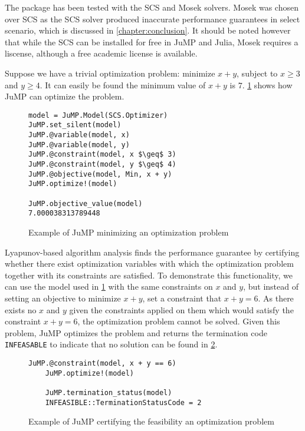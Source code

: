The package has been tested with the SCS \cite{SCS} and Mosek solvers. Mosek was chosen over SCS as the SCS solver produced inaccurate performance guarantees in select scenario, which is discussed in \cref{chapter:conclusion}. It should be noted however that while the SCS can be installed for free in JuMP and Julia, Mosek requires a liscense, although a free academic license is available.
 
Suppose we have a trivial optimization problem: minimize $x + y$, subject to $x \geq 3$ and $y \geq 4$. It can easily be found the minimum value of $x + y$ is $7$. \cref{ex_jump1} shows how JuMP can optimize the problem.

\begin{figure}[ht]
	\begin{lstlisting}[mathescape]
model = JuMP.Model(SCS.Optimizer)
JuMP.set_silent(model)
JuMP.@variable(model, x)
JuMP.@variable(model, y)
JuMP.@constraint(model, x $\geq$ 3)
JuMP.@constraint(model, y $\geq$ 4)
JuMP.@objective(model, Min, x + y)
JuMP.optimize!(model)

JuMP.objective_value(model)
7.000038313789448
	\end{lstlisting}
	\caption{Example of JuMP minimizing an optimization problem}
	\label{ex_jump1}
\end{figure}

Lyapunov-based algorithm analysis finds the performance guarantee by certifying whether there exist optimization variables with which the optimization problem together with its constraints are satisfied. To demonstrate this functionality, we can use the model used in \cref{ex_jump1} with the same constraints on $x$ and $y$, but instead of setting an objective to minimize $x + y$, set a constraint that $x + y = 6$. As there exists no $x$ and $y$ given the constraints applied on them which would satisfy the constraint $x + y = 6$, the optimization problem cannot be solved. Given this problem, JuMP optimizes the problem and returns the termination code \texttt{INFEASABLE} to indicate that no solution can be found in \cref{ex_jump2}.

\begin{figure}[ht]
	\begin{lstlisting}[mathescape]
	JuMP.@constraint(model, x + y == 6)
	JuMP.optimize!(model)
	
	JuMP.termination_status(model)
	INFEASIBLE::TerminationStatusCode = 2
	\end{lstlisting}
	\caption{Example of JuMP certifying the feasibility an optimization problem}
	\label{ex_jump2}
\end{figure}